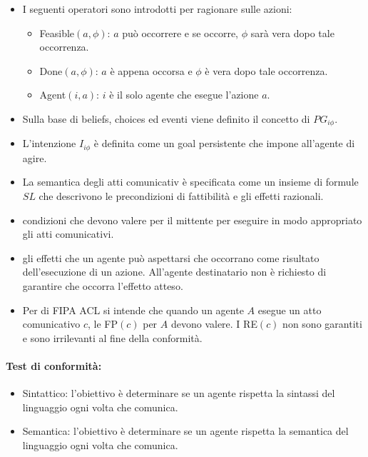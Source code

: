 \begin{itemize}
  \item I seguenti operatori sono introdotti per ragionare sulle azioni:
    \begin{itemize}
      \item Feasible$(a, \phi)$: $a$ può occorrere e se occorre, $\phi$ sarà vera dopo tale occorrenza. 
      \item Done$(a, \phi)$: $a$ è appena occorsa e $\phi$ è vera dopo tale occorrenza. 
      \item Agent$(i, a)$: $i$ è il solo agente che esegue l'azione $a$. 
    \end{itemize}
  \item Sulla base di beliefs, choices ed eventi viene definito il concetto di  $PG_{i\phi}$. 
  \item L'intenzione $I_{i\phi}$ è definita come un goal persistente che impone all'agente di agire. 
  \item La semantica degli atti comunicativ è specificata come un insieme di formule $SL$ che descrivono le precondizioni di fattibilità e gli effetti razionali.
  \item {} condizioni che devono valere per il mittente per eseguire in modo appropriato gli atti comunicativi. 
  \item {} gli effetti che un agente può aspettarsi che occorrano come risultato dell'esecuzione di un azione. All'agente destinatario non è richiesto di garantire che  occorra l'effetto atteso. 
  \item Per  di FIPA ACL si intende che quando un agente $A$ esegue un atto comunicativo $c$, le FP$(c)$ per $A$ devono valere. I RE$(c)$ non sono garantiti e sono irrilevanti al fine della conformità.
\end{itemize}

\paragraph{Test di conformità:}

\begin{itemize}
  \item Sintattico: l'obiettivo è determinare se un agente rispetta la sintassi del linguaggio ogni volta che comunica.
      \item Semantica: l'obiettivo è determinare se un agente rispetta la semantica del linguaggio ogni volta che comunica.
\end{itemize}


